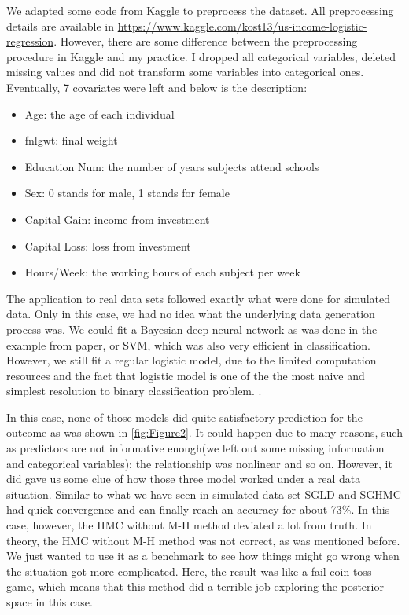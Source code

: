 \documentclass[11pt]{article}
\begin{document}
We adapted some code from Kaggle to preprocess the dataset. All preprocessing details are available in \url{https://www.kaggle.com/kost13/us-income-logistic-regression}. However, there are some difference between the preprocessing procedure in Kaggle and my practice. I dropped all categorical variables, deleted missing values and did not transform some variables into categorical ones. Eventually, 7 covariates were left and below is the description:
\begin{itemize}
    \item Age: the age of each individual
    \item fnlgwt: final weight
    \item Education Num: the number of years subjects attend schools
    \item Sex: 0 stands for male, 1 stands for female
    \item Capital Gain: income from investment
    \item Capital Loss: loss from investment
    \item Hours/Week: the working hours of each subject per week
\end{itemize}

The application to real data sets followed exactly what were done for simulated data. Only in this case, we had no idea what the underlying data generation process was. We could fit a Bayesian deep neural network as was done in the example from paper, or SVM\cite{welling2011bayesian}, which was also very efficient in classification. However, we still fit a regular logistic model, due to the limited computation resources and the fact that logistic model is one of the the most naive and simplest resolution to binary classification problem. . 

In this case, none of those models did quite satisfactory prediction for the outcome as was shown in \ref{fig:Figure2}. It could happen due to many reasons, such as predictors are not informative enough(we left out some missing information and categorical variables); the relationship was nonlinear and so on. However, it did gave us some clue of how those three model worked under a real data situation.
Similar to what we have seen in simulated data set SGLD and SGHMC had quick convergence and can finally reach an accuracy for about 73$\%$. In this case, however, the HMC without M-H method deviated a lot from truth. In theory, the HMC without M-H method was not correct, as was mentioned before. We just wanted to use it as a benchmark to see how things might go wrong when the situation got more complicated. Here, the result was like a fail coin toss game, which means that this method did a terrible job exploring the posterior space in this case.
\end{document}
